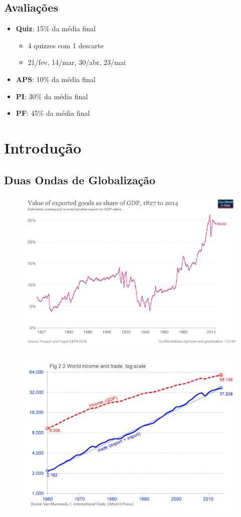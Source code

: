 \documentclass[a4paper,12pt]{article}[abntex2]
\begin{document}
\subsection*{\textbf{Avaliações}}
\begin{itemize}
    \item \textbf{Quiz}: 15\% da média final \begin{itemize}
        \item 4 quizzes com 1 descarte
        \item 21/fev, 14/mar, 30/abr, 23/mai
    \end{itemize}
    \item \textbf{APS}: 10\% da média final
    \item \textbf{PI}: 30\% da média final
    \item \textbf{PF}: 45\% da média final
\end{itemize}
\newpage

\section{\textbf{Introdução}}
\subsection{\textbf{Duas Ondas de Globalização}}

\begin{figure}[H]
    \centering
    \includegraphics[width=0.70\linewidth]{Imagens/a1i1.png}
\end{figure}

\begin{figure}[H]
    \centering
    \includegraphics[width=0.70\linewidth]{Imagens/a1i2.png}
\end{figure}
\end{document}
